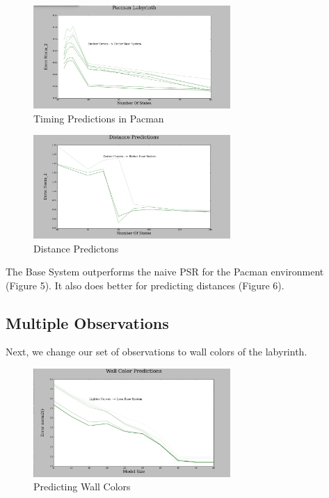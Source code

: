 \documentclass{acm_proc_article-sp}
\begin{document}
\begin{figure}[ht!]
\centering
\includegraphics[width=75mm]{lucasplots/monImages/PacmanLabyrinth.png}
\caption{Timing Predictions in Pacman \label{overflow}}
\end{figure}

\begin{figure}[ht!]
\centering
\includegraphics[width=75mm]{lucasplots/monImages/Distance_Predictions.png}
\caption{Distance Predictons\label{overflow}}
\end{figure}

The Base System outperforms the naive PSR for the Pacman environment (Figure 5). It also does better for predicting distances (Figure 6). 

\subsection{Multiple Observations}

Next, we change our set of observations to wall colors of the labyrinth. 

\begin{figure}[ht!]
\centering
\includegraphics[width=75mm]{lucasplots/monImages/WallColorPredictions.png}
\caption{Predicting Wall Colors \label{overflow}}
\end{figure}
\end{document}
